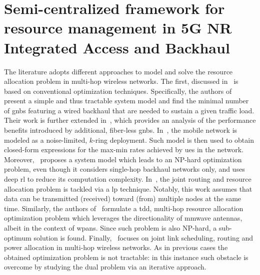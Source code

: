
\section{Semi-centralized framework for resource management in 5G NR Integrated Access and Backhaul}
\label{sec:iab-res-man}


The literature adopts different approaches to model and solve the resource allocation problem in multi-hop wireless networks. 
The first, discussed in~\cite{qualcomm1, qualcomm2, kulkarni2018max, lei2020deep, rasekh2015interference, bilal2014time, cruz2003optimal} is based on conventional optimization techniques.
Specifically, the authors of~\cite{qualcomm1} present a simple and thus tractable system model and find the minimal number of \glspl{gnb} featuring a wired backhaul that are needed to sustain a given traffic load. Their work is further extended in~\cite{qualcomm2}, which provides an analysis of the performance benefits introduced by additional, fiber-less \glspl{gnb}. 
In~\cite{kulkarni2018max}, the mobile network is modeled as a noise-limited, $k$-ring deployment. Such model is then used to obtain closed-form expressions for the max-min rates achieved by \glspl{ue} in the network. Moreover,~\cite{lei2020deep} proposes a system model which leads to an NP-hard optimization problem, even though it considers single-hop backhaul networks only, and uses deep \gls{rl} to reduce its computation complexity. In~\cite{rasekh2015interference}, the joint routing and resource allocation problem is tackled via a \gls{lp} technique. Notably, this work assumes that data can be transmitted (received) toward (from) multiple nodes at the same time.
Similarly, the authors of~\cite{bilal2014time} formulate a \gls{tdd}, multi-hop resource allocation optimization problem which leverages the directionality of \gls{mmwave} antennas, albeit in the context of \gls{wpans}. Since such problem is also NP-hard, a sub-optimum solution is found. Finally,~\cite{cruz2003optimal} focuses on joint link scheduling, routing and power allocation in multi-hop wireless networks. As in previous cases the obtained optimization problem is not tractable: in this instance such obstacle is overcome by studying the dual problem via an iterative approach.

